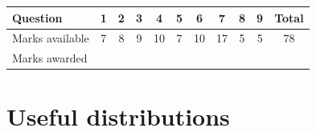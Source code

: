 \documentclass[11pt,a4paper]{article}
\begin{document}
\vspace{0.6cm}
\begin{center}
\begin{tabular}{@{}lccccccccc|c@{}}
\toprule
Question & 1 & 2 & 3 & 4 & 5 & 6 & 7 & 8 & 9 & Total\\
\midrule
Marks available & 7 & 8 & 9 & 10 & 7 & 10 & 17 & 5 & 5 & 78\\
\addlinespace[4pt]
Marks awarded & & & & & & & & & &\\[8pt]
\bottomrule
\end{tabular}
\end{center}
\clearpage

\section*{Useful distributions}
\end{document}

